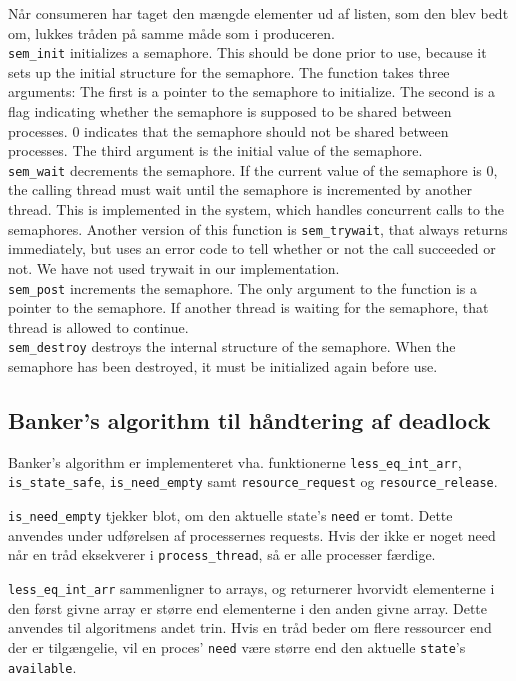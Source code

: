 Når consumeren har taget den mængde elementer ud af listen, som den blev bedt om, lukkes tråden på samme måde som i produceren.\\

\texttt{sem\_init} initializes a semaphore. This should be done prior to use, because it sets up the initial structure for the semaphore. The function takes three arguments: The first is a pointer to the semaphore to initialize. The second is a flag indicating whether the semaphore is supposed to be shared between processes. 0 indicates that the semaphore should not be shared between processes. The third argument is the initial value of the semaphore.\\

\texttt{sem\_wait} decrements the semaphore. If the current value of the semaphore is 0, the calling thread must wait until the semaphore is incremented by another thread. This is implemented in the system, which handles concurrent calls to the semaphores. Another version of this function is \texttt{sem\_trywait}, that always returns immediately, but uses an error code to tell whether or not the call succeeded or not. We have not used trywait in our implementation.\\

\texttt{sem\_post} increments the semaphore. The only argument to the function is a pointer to the semaphore. If another thread is waiting for the semaphore, that thread is allowed to continue.\\

\texttt{sem\_destroy} destroys the internal structure of the semaphore. When the semaphore has been destroyed, it must be initialized again before use.

\subsection{Banker's algorithm til håndtering af deadlock}
Banker's algorithm er implementeret vha. funktionerne \texttt{less\_eq\_int\_arr}, \texttt{is\_state\_safe}, \texttt{is\_need\_empty} samt \texttt{resource\_request} og \texttt{resource\_release}. 

\texttt{is\_need\_empty} tjekker blot, om den aktuelle state's \texttt{need} er tomt. Dette anvendes under udførelsen af processernes requests. Hvis der ikke er noget need når en tråd eksekverer i \texttt{process\_thread}, så er alle processer færdige.   

\texttt{less\_eq\_int\_arr} sammenligner to arrays, og returnerer hvorvidt elementerne i den først givne array er større end elementerne i den anden givne array. Dette anvendes til algoritmens andet trin. Hvis en tråd beder om flere ressourcer end der er tilgængelie, vil en proces' \texttt{need} være større end den aktuelle \texttt{state}'s \texttt{available}.

